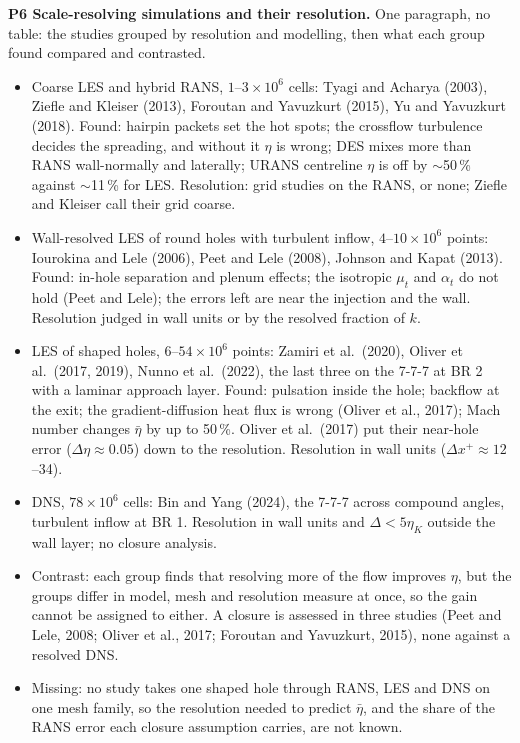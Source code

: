 \documentclass[10pt]{article}
\begin{document}
\textbf{P6 Scale-resolving simulations and their resolution.} One paragraph, no table: the studies grouped by
resolution and modelling, then what each group found compared and contrasted.
\begin{itemize}
\item Coarse LES and hybrid RANS, $1$--$3\times10^{6}$ cells: Tyagi and Acharya (2003), Ziefle and Kleiser
  (2013), Foroutan and Yavuzkurt (2015), Yu and Yavuzkurt (2018). Found: hairpin packets set the hot spots; the
  crossflow turbulence decides the spreading, and without it $\eta$ is wrong; DES mixes more than RANS
  wall-normally and laterally; URANS centreline $\eta$ is off by $\sim$50\,\% against $\sim$11\,\% for LES.
  Resolution: grid studies on the RANS, or none; Ziefle and Kleiser call their grid coarse.
\item Wall-resolved LES of round holes with turbulent inflow, $4$--$10\times10^{6}$ points: Iourokina and Lele
  (2006), Peet and Lele (2008), Johnson and Kapat (2013). Found: in-hole separation and plenum effects; the
  isotropic $\mu_t$ and $\alpha_t$ do not hold (Peet and Lele); the errors left are near the injection and the
  wall. Resolution judged in wall units or by the resolved fraction of $k$.
\item LES of shaped holes, $6$--$54\times10^{6}$ points: Zamiri et al.\ (2020), Oliver et al.\ (2017, 2019), Nunno
  et al.\ (2022), the last three on the 7-7-7 at BR 2 with a laminar approach layer. Found: pulsation inside the
  hole; backflow at the exit; the gradient-diffusion heat flux is wrong (Oliver et al., 2017); Mach number changes
  $\bar\eta$ by up to 50\,\%. Oliver et al.\ (2017) put their near-hole error ($\Delta\eta\approx0.05$) down to the
  resolution. Resolution in wall units ($\Delta x^+\approx12$--34).
\item DNS, $78\times10^{6}$ cells: Bin and Yang (2024), the 7-7-7 across compound angles, turbulent inflow at
  BR 1. Resolution in wall units and $\Delta<5\eta_K$ outside the wall layer; no closure analysis.
\item Contrast: each group finds that resolving more of the flow improves $\eta$, but the groups differ in
  model, mesh and resolution measure at once, so the gain cannot be assigned to either. A closure is assessed in
  three studies (Peet and Lele, 2008; Oliver et al., 2017; Foroutan and Yavuzkurt, 2015), none against a resolved
  DNS.
\item Missing: no study takes one shaped hole through RANS, LES and DNS on one mesh family, so the resolution
  needed to predict $\bar\eta$, and the share of the RANS error each closure assumption carries, are not known.
\end{itemize}
\end{document}
